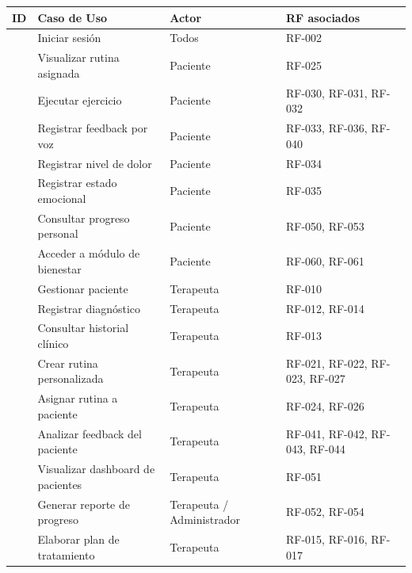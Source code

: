 \begin{longtable}{L{1.6cm} L{5cm} L{3.5cm} L{4cm}}
  \toprule
  \textbf{\color{fmAccent}ID} &
  \textbf{\color{fmAccent}Caso de Uso} &
  \textbf{\color{fmAccent}Actor} &
  \textbf{\color{fmAccent}RF asociados} \\
  \midrule
  \endhead

   & Iniciar sesión & Todos & RF-002 \\
   & Visualizar rutina asignada & Paciente & RF-025 \\
   & Ejecutar ejercicio & Paciente & RF-030, RF-031, RF-032 \\
   & Registrar feedback por voz & Paciente & RF-033, RF-036, RF-040 \\
   & Registrar nivel de dolor & Paciente & RF-034 \\
   & Registrar estado emocional & Paciente & RF-035 \\
   & Consultar progreso personal & Paciente & RF-050, RF-053 \\
   & Acceder a módulo de bienestar & Paciente & RF-060, RF-061 \\
   & Gestionar paciente & Terapeuta & RF-010 \\
   & Registrar diagnóstico & Terapeuta & RF-012, RF-014 \\
   & Consultar historial clínico & Terapeuta & RF-013 \\
   & Crear rutina personalizada & Terapeuta & RF-021, RF-022, RF-023, RF-027 \\
   & Asignar rutina a paciente & Terapeuta & RF-024, RF-026 \\
   & Analizar feedback del paciente & Terapeuta & RF-041, RF-042, RF-043, RF-044 \\
   & Visualizar dashboard de pacientes & Terapeuta & RF-051 \\
   & Generar reporte de progreso & Terapeuta / Administrador & RF-052, RF-054 \\
   & Elaborar plan de tratamiento & Terapeuta & RF-015, RF-016, RF-017 \\

\end{longtable}
